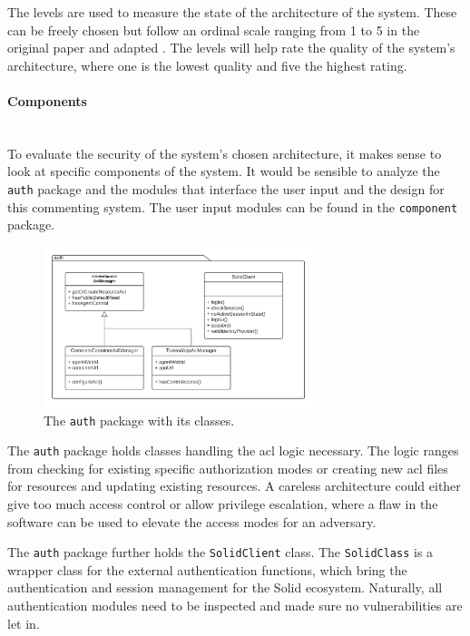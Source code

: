 The levels are used to measure the state of the architecture of the system. These can be freely chosen but follow an ordinal scale ranging from 1 to 5 in the original paper and adapted \cite{asqa-paper}. The levels will help rate the quality of the system's architecture, where one is the lowest quality and five the highest rating.
\vspace{0.5cm}
\paragraph{Components}\mbox{}\\

To evaluate the security of the system's chosen architecture, it makes sense to look at specific components of the system. It would be sensible to analyze the \texttt{auth} package and the modules that interface the user input and the design for this commenting system. The user input modules can be found in the \texttt{component} package.

\begin{figure}[!ht]
    \centering
    \includegraphics[width=0.7\textwidth]{prototype/graphs/poc-comment-package-auth.png}
    \caption{The \texttt{auth} package with its classes.}
    \label{fig:poc-comment-package-auth}
\end{figure}

The \texttt{auth} package holds classes handling the \gls{acl} logic necessary. The logic ranges from checking for existing specific authorization modes or creating new \gls{acl} files for resources and updating existing resources. A careless architecture could either give too much access control or allow privilege escalation, where a flaw in the software can be used to elevate the access modes for an adversary.

The \texttt{auth} package further holds the \texttt{SolidClient} class. The \texttt{SolidClass} is a wrapper class for the external authentication functions, which bring the authentication and session management for the Solid ecosystem. Naturally, all authentication modules need to be inspected and made sure no vulnerabilities are let in.

